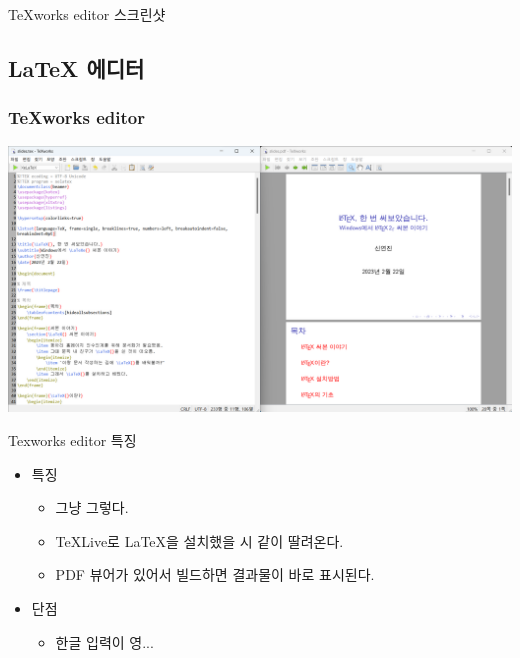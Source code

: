 \documentclass{beamer}
\begin{document}
\begin{frame}[allowframebreaks]{TeXworks editor 스크린샷}
    \subsection{\LaTeX{} 에디터}
    \subsubsection{TeXworks editor}
    \begin{center}
        \includegraphics[scale=0.25]{images/texworks_editor.png}
    \end{center}
\end{frame}
\begin{frame}{Texworks editor 특징}
    \begin{itemize}
        \item 특징
        \begin{itemize}
            \item 그냥 그렇다.
            \item TeXLive로 \LaTeX{}을 설치했을 시 같이 딸려온다.
            \item PDF 뷰어가 있어서 빌드하면 결과물이 바로 표시된다.
        \end{itemize}
        \item 단점
        \begin{itemize}
            \item 한글 입력이 영...
        \end{itemize}
    \end{itemize}
\end{frame}
\end{document}
